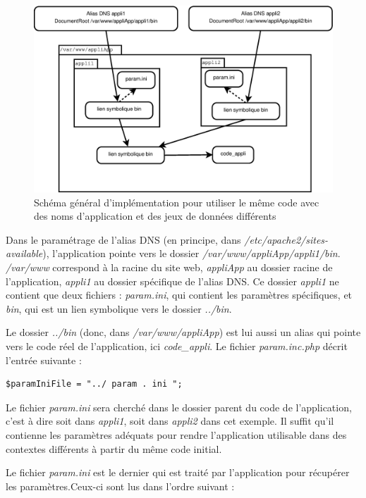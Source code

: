 \begin{figure}[H]
\label{dnsmultipleschema}
\includegraphics[width=\linewidth]{images/dnsmultiple}
\caption{Schéma général d’implémentation pour utiliser le même code avec des noms d’application et des jeux de données différents}
\end{figure}

Dans le paramétrage de l’alias DNS (en principe, dans \textit{/etc/apache2/sites-available}), l’application pointe vers le dossier \textit{/var/www/appliApp/appli1/bin}. \textit{/var/www} correspond à la racine du site web, \textit{appliApp} au dossier racine de l’application, \textit{appli1} au dossier spécifique de l’alias DNS. Ce dossier \textit{appli1} ne contient que deux fichiers : \textit{param.ini}, qui contient les paramètres spécifiques, et \textit{bin}, qui est un lien symbolique vers le dossier \textit{../bin}.

Le dossier \textit{../bin} (donc, dans\textit{ /var/www/appliApp}) est lui aussi un alias qui pointe vers le code réel de l’application, ici \textit{code\_appli}. Le fichier \textit{param.inc.php} décrit l’entrée suivante : 
\begin{lstlisting}
$paramIniFile = "../ param . ini "; 
\end{lstlisting}

Le fichier \textit{param.ini} sera cherché dans le dossier parent du code de l’application, c’est à dire soit dans \textit{appli1}, soit dans \textit{appli2} dans cet exemple. Il suffit qu’il contienne les paramètres adéquats pour rendre l’application utilisable dans des contextes différents à partir du même code initial.



Le fichier \textit{param.ini} est le dernier qui est traité par l'application pour récupérer les paramètres.Ceux-ci sont lus dans l'ordre suivant :

